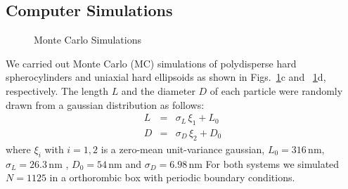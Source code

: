 \documentclass[aps,prl,preprint,superscriptaddress]{revtex4-1}
\def\nm{\,\si{\nano\meter}}
\begin{document}
\subsection{Computer Simulations}
\begin{figure}[ht]
\caption{Monte Carlo Simulations}
\label{fig:sim}
\end{figure}

We carried out Monte Carlo (MC) simulations of polydisperse hard spherocylinders and uniaxial hard ellipsoids as shown in Figs.~\ref{fig:sim}c and ~\ref{fig:sim}d, respectively.
The length $L$ and the diameter $D$ of each particle were randomly drawn from a gaussian distribution as follows:
\begin{eqnarray}
  L &=& \sigma_L\,\xi_1 + L_0\\
  D &=& \sigma_D\,\xi_2 + D_0
\end{eqnarray}
where $\xi_i$ with $i=1,2$ is a zero-mean unit-variance gaussian, $L_0=316 \nm$, $\sigma_L=26.3 \nm$ , $D_0=54 \nm$ and $\sigma_D=6.98 \nm$
For both systems we simulated $N=1125$ in a orthorombic box with periodic boundary conditions.
\end{document}

